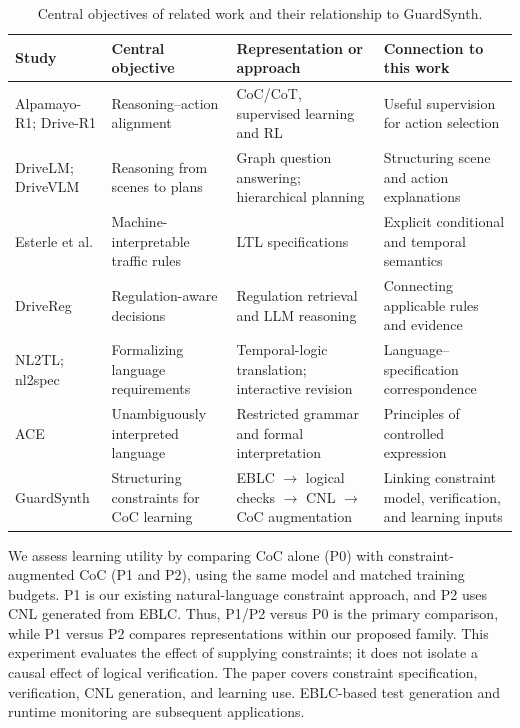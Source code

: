 \documentclass[nolineno]{ieeeaccess}
\begin{document}
\begin{table}[tp]\caption{Central objectives of related work and their relationship to GuardSynth.}\label{tab:related-work}
\centering\fontsize{8}{10}\selectfont\setlength{\tabcolsep}{3pt}
\begin{tabular}{@{}>{\raggedright\arraybackslash}p{}>{\raggedright\arraybackslash}p{}>{\raggedright\arraybackslash}p{}>{\raggedright\arraybackslash}p{}@{}}
\toprule
\textbf{Study} & \textbf{Central objective} & \textbf{Representation or approach} & \textbf{Connection to this work}\\
\midrule
Alpamayo-R1; Drive-R1 \cite{r1,r5} & Reasoning--action alignment & CoC/CoT, supervised learning and RL & Useful supervision for action selection\\[3pt]
DriveLM; DriveVLM \cite{r2,r3} & Reasoning from scenes to plans & Graph question answering; hierarchical planning & Structuring scene and action explanations\\[3pt]
Esterle et al. \cite{r6} & Machine-interpretable traffic rules & LTL specifications & Explicit conditional and temporal semantics\\[3pt]
DriveReg \cite{r7} & Regulation-aware decisions & Regulation retrieval and LLM reasoning & Connecting applicable rules and evidence\\[3pt]
NL2TL; nl2spec \cite{r8,r9} & Formalizing language requirements & Temporal-logic translation; interactive revision & Language--specification correspondence\\[3pt]
ACE \cite{r10} & Unambiguously interpreted language & Restricted grammar and formal interpretation & Principles of controlled expression\\[3pt]
GuardSynth & Structuring constraints for CoC learning & EBLC \ensuremath{\rightarrow} logical checks \ensuremath{\rightarrow} CNL \ensuremath{\rightarrow} CoC augmentation & Linking constraint model, verification, and learning inputs\\[3pt]
\bottomrule\end{tabular}
\end{table}

We assess learning utility by comparing CoC alone (P0) with constraint-augmented CoC (P1 and P2), using the same model and matched training budgets. P1 is our existing natural-language constraint approach, and P2 uses CNL generated from EBLC. Thus, P1/P2 versus P0 is the primary comparison, while P1 versus P2 compares representations within our proposed family. This experiment evaluates the effect of supplying constraints; it does not isolate a causal effect of logical verification. The paper covers constraint specification, verification, CNL generation, and learning use. EBLC-based test generation and runtime monitoring are subsequent applications.\par
\end{document}

